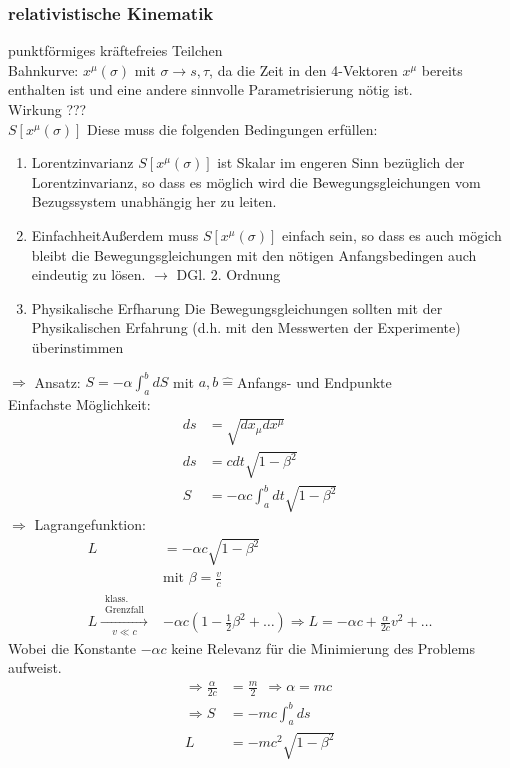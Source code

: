 \documentclass[a4paper]{article}
\begin{document}
\subsubsection{relativistische Kinematik}
punktförmiges kräftefreies Teilchen\\
Bahnkurve: $x^\mu(\sigma)$ mit $\sigma \rightarrow s,\tau$, da die Zeit in den
4-Vektoren $x^\mu$ bereits enthalten ist und eine andere sinnvolle
Parametrisierung nötig ist.\\
Wirkung ???\\
$S[x^\mu(\sigma)]$ 
Diese muss die folgenden Bedingungen erfüllen:
\begin{enumerate}
  \item{Lorentzinvarianz} $S[x^\mu(\sigma)]$ ist Skalar im engeren Sinn
   bezüglich der Lorentzinvarianz, so dass es möglich wird die
   Bewegungsgleichungen vom Bezugssystem unabhängig her zu leiten.
  \item{Einfachheit}Außerdem muss $S[x^\mu(\sigma)]$ einfach
   sein, so dass es auch mögich bleibt die Bewegungsgleichungen mit den nötigen
   Anfangsbedingen auch eindeutig zu lösen. $\rightarrow$ DGl. 2. Ordnung
  \item{Physikalische Erfharung} Die Bewegungsgleichungen sollten mit der
  Physikalischen Erfahrung (d.h. mit den Messwerten der Experimente)
  überinstimmen
\end{enumerate}
$\Rightarrow$ Ansatz: $S=-\alpha\int_a^b dS$ mit $a,b\hat{=}$Anfangs- und
Endpunkte\\
Einfachste Möglichkeit: 
\begin{align}
ds&=\sqrt{dx_\mu dx^\mu}\\
ds&=cdt\sqrt{1-\beta^2}\\
S&=-\alpha c \int_a^b dt \sqrt{1-\beta^2}
\end{align}
$\Rightarrow$ Lagrangefunktion: 
\begin{align} 
L&=-\alpha c \sqrt{1-\beta^2} \\
&\text{mit }\beta=\frac{v}{c}\\
L \overset{\substack{\text{klass.}\\
\text{Grenzfall}}}{\underset{{v \ll c}}{\longrightarrow}}& 
-\alpha c \left(1-\frac{1}{2}\beta^2+\ldots\right) \Rightarrow L=-\alpha c +
\frac{\alpha}{2 c} v^2 + \ldots
\end{align}
Wobei die Konstante $-\alpha c$ keine Relevanz für die Minimierung des Problems
aufweist.
\begin{align}
\Rightarrow \frac{\alpha}{2 c}&=\frac{m}{2} \ \ \Rightarrow \alpha=m c \\
\Rightarrow S&=-mc\int^b_a ds \\
L&=-mc^2\sqrt{1-\beta^2}
\end{align}
\end{document}
